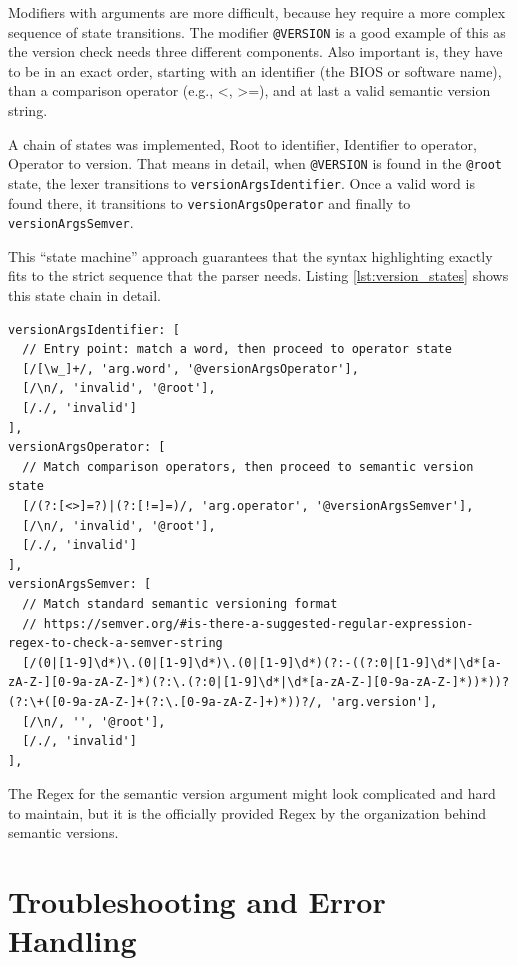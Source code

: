 Modifiers with arguments are more difficult, because hey require a more complex sequence of state transitions. The modifier \texttt{@VERSION} is a good example of this as the version check needs three different components. Also important is,  they have to be in an exact order, starting with an identifier (the BIOS or software name), than a comparison operator (e.g., <, >=), and at last a valid semantic version string.

A chain of states was implemented, Root to identifier, Identifier to operator, Operator to version. That means in detail, when \texttt{@VERSION} is found in the \texttt{@root} state, the lexer transitions to \texttt{versionArgsIdentifier}. Once a valid word is found there, it transitions to \texttt{versionArgsOperator} and finally to \texttt{versionArgsSemver}.

This ``state machine'' approach guarantees that the syntax highlighting exactly fits to the strict sequence that the parser needs. Listing \ref{lst:version_states} shows this state chain in detail. 

\begin{lstlisting}[caption={State transitions for the \texttt{@VERSION} modifier}, label={lst:version_states}]
versionArgsIdentifier: [ 
  // Entry point: match a word, then proceed to operator state
  [/[\w_]+/, 'arg.word', '@versionArgsOperator'],
  [/\n/, 'invalid', '@root'],
  [/./, 'invalid']
],
versionArgsOperator: [
  // Match comparison operators, then proceed to semantic version state
  [/(?:[<>]=?)|(?:[!=]=)/, 'arg.operator', '@versionArgsSemver'],
  [/\n/, 'invalid', '@root'],
  [/./, 'invalid']
],
versionArgsSemver: [
  // Match standard semantic versioning format
  // https://semver.org/#is-there-a-suggested-regular-expression-regex-to-check-a-semver-string
  [/(0|[1-9]\d*)\.(0|[1-9]\d*)\.(0|[1-9]\d*)(?:-((?:0|[1-9]\d*|\d*[a-zA-Z-][0-9a-zA-Z-]*)(?:\.(?:0|[1-9]\d*|\d*[a-zA-Z-][0-9a-zA-Z-]*))*))?(?:\+([0-9a-zA-Z-]+(?:\.[0-9a-zA-Z-]+)*))?/, 'arg.version'],
  [/\n/, '', '@root'],
  [/./, 'invalid']
],
\end{lstlisting}

The Regex for the semantic version argument might look complicated and hard to maintain, but it is the officially provided Regex by the organization behind semantic versions. 

\section{Troubleshooting and Error Handling}

